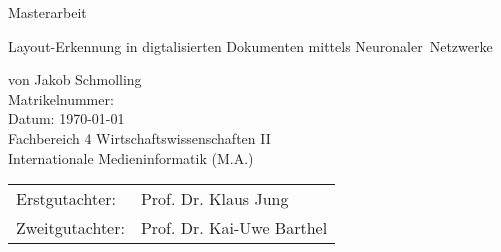 \begin{titlepage}
    \vspace*{\baselineskip}
    \vspace*{0.167\textheight} 
    Masterarbeit\\
    \vspace{\baselineskip}
    \begin{minipage}{15cm}
    {\huge Layout-Erkennung in digtalisierten Dokumenten mittels Neuronaler~Netzwerke\par}
    \end{minipage}
    
    \vspace{\baselineskip}
    von Jakob Schmolling\\
    \vfill
    Matrikelnummer:\\
    \vspace{\baselineskip}
    Datum: \today \\
    \vspace{\baselineskip}
    Fachbereich 4 Wirtschaftswissenschaften II\\
    Internationale Medieninformatik (M.A.)\\
    \vspace{\baselineskip}
    \begin{tabular}{@{\hspace{0em}}ll}
    Erstgutachter: & Prof. Dr. Klaus Jung\\
    Zweitgutachter: & Prof. Dr. Kai-Uwe Barthel\\
    \end{tabular}
\end{titlepage}


